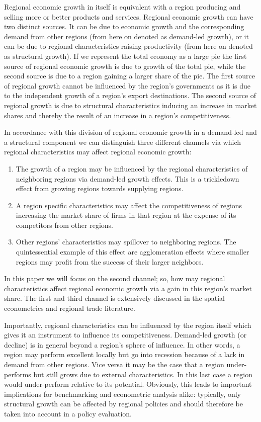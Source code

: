 \documentclass[11pt,parskip,abstracton,notitlepage, paper=a4]{scrartcl}
\begin{document}
Regional economic growth in itself is equivalent with a region producing and selling more or better products and services. Regional economic growth can have two distinct sources. It can be due to economic growth and the corresponding demand from other regions (from here on denoted as demand-led growth), or it can be due to regional characteristics raising productivity (from here on denoted as structural growth). If we represent the total economy as a large pie the first source of regional economic growth is due to growth of the total pie, while the second source is due to a region gaining a larger share of the pie. The first source of regional growth cannot be influenced by the region's governments as it is due to the independent growth of a region's export destinations. The second source of regional growth is due to structural characteristics inducing an increase in market shares and thereby the result of an increase in a region's competitiveness.

In accordance with this division of regional economic growth in a demand-led and a structural component we can distinguish three different channels via which regional characteristics may affect regional economic growth: 
\begin{enumerate}
	\item The growth of a region may be influenced by the regional characteristics of neighboring regions via demand-led growth effects. This is a trickledown effect from growing regions towards supplying regions.
	\item A region specific characteristics may affect the competitiveness of regions increasing the market share of firms in that region at the expense of its competitors from other regions. 
	\item Other regions' characteristics may spillover to neighboring regions. The quintessential example of this effect are agglomeration effects where smaller regions may profit from the success of their larger neighbors.
\end{enumerate}

In this paper we will focus on the second channel; so, how may regional characteristics affect regional economic growth via a gain in this region's market share. The first and third channel is extensively discussed in the spatial econometrics and regional trade literature. 

Importantly, regional characteristics can be influenced by the region itself which gives it an instrument to influence its competitiveness. Demand-led growth (or decline) is in general beyond a region's sphere of influence. In other words, a region may perform excellent locally but go into recession because of a lack in demand from other regions. Vice versa it may be the case that a region under-performs but still grows due to external characteristics. In this last case a region would under-perform relative to its potential. Obviously, this leads to important implications for benchmarking and econometric analysis alike: typically, only structural growth can be affected by regional policies and should therefore be taken into account in a policy evaluation.
\end{document}

